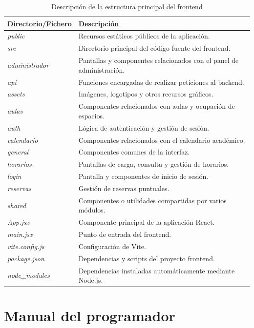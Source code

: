 \begin{table}[H]
	\centering
	\begin{tabular}{l p{9cm}}
		\toprule
		\textbf{Directorio/Fichero} & \textbf{Descripción} \\
		\midrule
		\textit{public} & Recursos estáticos públicos de la aplicación. \\
		\textit{src} & Directorio principal del código fuente del frontend. \\
		\textit{administrador} & Pantallas y componentes relacionados con el panel de administración. \\
		\textit{api} & Funciones encargadas de realizar peticiones al backend. \\
		\textit{assets} & Imágenes, logotipos y otros recursos gráficos. \\
		\textit{aulas} & Componentes relacionados con aulas y ocupación de espacios. \\
		\textit{auth} & Lógica de autenticación y gestión de sesión. \\
		\textit{calendario} & Componentes relacionados con el calendario académico. \\
		\textit{general} & Componentes comunes de la interfaz. \\
		\textit{horarios} & Pantallas de carga, consulta y gestión de horarios. \\
		\textit{login} & Pantalla y componentes de inicio de sesión. \\
		\textit{reservas} & Gestión de reservas puntuales. \\
		\textit{shared} & Componentes o utilidades compartidas por varios módulos. \\
		\textit{App.jsx} & Componente principal de la aplicación React. \\
		\textit{main.jsx} & Punto de entrada del frontend. \\
		\textit{vite.config.js} & Configuración de Vite. \\
		\textit{package.json} & Dependencias y scripts del proyecto frontend. \\
		\textit{node\_modules} & Dependencias instaladas automáticamente mediante Node.js. \\
		\bottomrule
	\end{tabular}
	\caption{Descripción de la estructura principal del frontend}
	\label{tab:estructura-frontend}
\end{table}


\section{Manual del programador}

